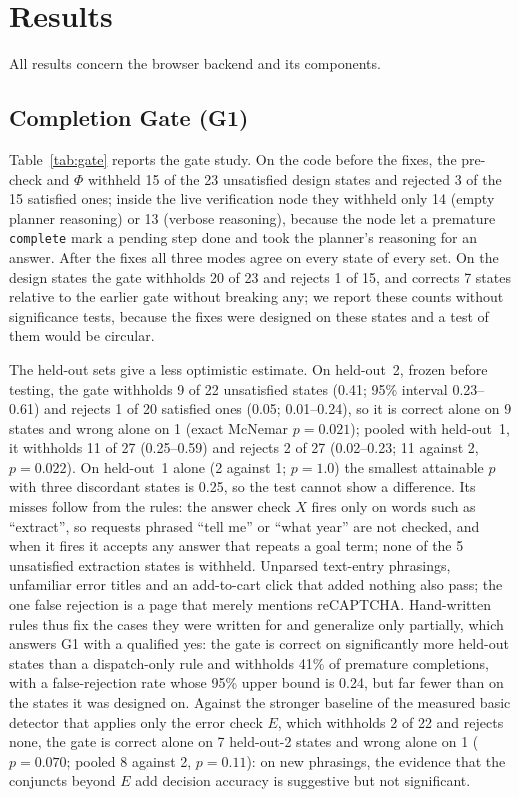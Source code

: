 \section{Results}
\label{sec:results}

All results concern the browser backend and its components.

\subsection{Completion Gate (G1)}
\label{sec:res-gate}



Table~\ref{tab:gate} reports the gate study. On the code before the fixes, the pre-check and $\Phi$ withheld 15 of the 23 unsatisfied design states and rejected 3 of the 15 satisfied ones; inside the live verification node they withheld only 14 (empty planner reasoning) or 13 (verbose reasoning), because the node let a premature \texttt{complete} mark a pending step done and took the planner's reasoning for an answer. After the fixes all three modes agree on every state of every set. On the design states the gate withholds 20 of 23 and rejects 1 of 15, and corrects 7 states relative to the earlier gate without breaking any; we report these counts without significance tests, because the fixes were designed on these states and a test of them would be circular.

The held-out sets give a less optimistic estimate. On held-out~2, frozen before testing, the gate withholds 9 of 22 unsatisfied states (0.41; 95\% interval 0.23--0.61) and rejects 1 of 20 satisfied ones (0.05; 0.01--0.24), so it is correct alone on 9 states and wrong alone on 1 (exact McNemar $p=0.021$); pooled with held-out~1, it withholds 11 of 27 (0.25--0.59) and rejects 2 of 27 (0.02--0.23; 11 against 2, $p=0.022$). On held-out~1 alone (2 against 1; $p=1.0$) the smallest attainable $p$ with three discordant states is 0.25, so the test cannot show a difference. Its misses follow from the rules: the answer check $X$ fires only on words such as ``extract'', so requests phrased ``tell me'' or ``what year'' are not checked, and when it fires it accepts any answer that repeats a goal term; none of the 5 unsatisfied extraction states is withheld. Unparsed text-entry phrasings, unfamiliar error titles and an add-to-cart click that added nothing also pass; the one false rejection is a page that merely mentions reCAPTCHA. Hand-written rules thus fix the cases they were written for and generalize only partially, which answers G1 with a qualified yes: the gate is correct on significantly more held-out states than a dispatch-only rule and withholds 41\% of premature completions, with a false-rejection rate whose 95\% upper bound is 0.24, but far fewer than on the states it was designed on. Against the stronger baseline of the measured basic detector that applies only the error check $E$, which withholds 2 of 22 and rejects none, the gate is correct alone on 7 held-out-2 states and wrong alone on 1 ($p=0.070$; pooled 8 against 2, $p=0.11$): on new phrasings, the evidence that the conjuncts beyond $E$ add decision accuracy is suggestive but not significant.

